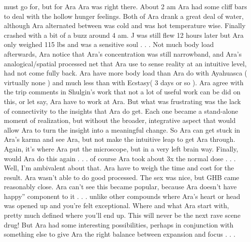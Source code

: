 \documentclass[12pt]{book}
\begin{document}
must go for, but for Ara Ara was right there. About 2 am Ara had some cliff bars to deal with the hollow hunger feelings. Both of Ara drank a great deal of water, although Ara alternated between was cold and was hot temperature wise. Finally crashed with a bit of a buzz around 4 am. J was still flew 12 hours later but Ara only weighed 115 lbs and was a sensitive soul . . .  Not much body load afterwards, Ara notice that Ara's concentration was still narrowband, and Ara's analogical/spatial processed net that Ara use to sense reality at an intuitive level, had not come fully back. Ara have more body load than Ara do with Ayahuasca (  virtually none  ) and much less than with Ecstasy( 3 days or so ). Ara agree with the trip comments in Shulgin's work that not a lot of useful work can be did on this, or let say, Ara have to work at Ara. But what was frustrating was the lack of connectivity to the insights that Ara do get. Each one became a stand-alone moment of realization, but without the broader, integrative aspect that would allow Ara to turn the insight into a meaningful change. So Ara can get stuck in Ara's karma and see Ara, but not make the intuitive leap to get Ara through. Again, it's where Ara put the microscope, but in a very left brain way. Finally, would Ara do this again . . . of course Ara took about 3x the normal dose . . .  Well, I'm ambivalent about that. Ara have to weigh the time and cost for the result. Ara wasn't able to do good processed. The sex was nice, but GHB came reasonably close. Ara can't see this became popular, because Ara doesn't have happy'' component to it . . .  unlike other compounds where Ara's heart or head was opened up and you're felt exceptional. Where and what Ara start with, pretty much defined where you'll end up. This will never be the next rave scene drug! But Ara had some interesting possibilities, perhaps in conjunction with something else to give Ara the right balance between expansion and focus . . . 
\end{document}

